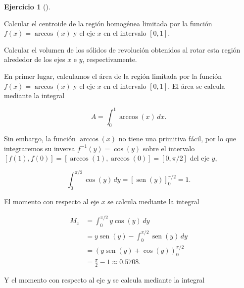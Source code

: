 \documentclass[
  spanish,
  a4paper,
]{scrreport}
\theoremstyle{definition}
\newtheorem{exercise}{Ejercicio}[chapter]
\theoremstyle{remark}
\begin{document}
\begin{exercise}[]\protect\hypertarget{exr-3}{}\label{exr-3}

Calcular el centroide de la región homogénea limitada por la función
\(f(x) = \operatorname{arccos}(x)\) y el eje \(x\) en el intervalo
\([0, 1]\).

Calcular el volumen de los sólidos de revolución obtenidos al rotar esta
región alrededor de los ejes \(x\) e \(y\), respectivamente.

\end{exercise}

\begin{tcolorbox}[enhanced jigsaw, arc=.35mm, bottomrule=.15mm, bottomtitle=1mm, breakable, colback=white, colbacktitle=quarto-callout-tip-color!10!white, colframe=quarto-callout-tip-color-frame, coltitle=black, left=2mm, leftrule=.75mm, opacityback=0, opacitybacktitle=0.6, rightrule=.15mm, title=\textcolor{quarto-callout-tip-color}{\faLightbulb}\hspace{0.5em}{Solución}, titlerule=0mm, toprule=.15mm, toptitle=1mm]

En primer lugar, calculamos el área de la región limitada por la función
\(f(x) = \operatorname{arccos}(x)\) y el eje \(x\) en el intervalo
\([0, 1]\). El área se calcula mediante la integral

\[
A = \int_0^1 \operatorname{arccos}(x) \, dx.
\]

Sin embargo, la función \(\operatorname{arccos}(x)\) no tiene una
primitiva fácil, por lo que integraremos su inversa
\(f^{-1}(y) = \cos(y)\) sobre el intervalo
\([f(1), f(0)] = [\operatorname{arccos}(1), \operatorname{arccos}(0)] = [0, \pi/2]\)
del eje \(y\),

\[
\int_0^{\pi/2} \cos(y) \, dy = \left[\operatorname{sen}(y)\right]_0^{\pi/2} = 1.
\]

El momento con respecto al eje \(x\) se calcula mediante la integral

\begin{align*}
M_x &= \int_0^{\pi/2} y\cos(y) \, dy \\
&= y\operatorname{sen}(y) - \int_0^{\pi/2} \operatorname{sen}(y) \, dy \tag{partes}\\ 
&= \left(y\operatorname{sen}(y) + \cos(y)\right)_0^{\pi/2} \\
&= \frac{\pi}{2} - 1
\approx 0.5708.
\end{align*}

Y el momento con respecto al eje \(y\) se calcula mediante la integral


\end{tcolorbox}
\end{document}
